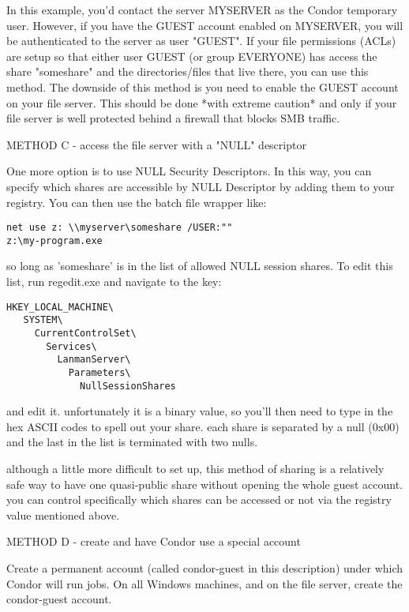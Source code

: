 In this example, you'd contact the server MYSERVER as the Condor temporary 
user.  However, if you have the GUEST account enabled on MYSERVER, you will 
be authenticated to the server as user "GUEST".  If your file permissions 
(ACLs) are setup so that either user GUEST (or group EVERYONE) has access 
the share "someshare" and the directories/files that live there, you can 
use this method.  The downside of this method is you need to enable the 
GUEST account on your file server.   \Warn This should be done *with 
extreme caution* and only if your file server is well protected behind a 
firewall that blocks SMB traffic.

METHOD C - access the file server with a "NULL" descriptor

One more option is to use NULL Security Descriptors.  In this way, you
can specify which shares are accessible by NULL Descriptor by adding
them to your registry.  You can then use the batch file wrapper like:

\begin{verbatim}
net use z: \\myserver\someshare /USER:""
z:\my-program.exe
\end{verbatim}

so long as 'someshare' is in the list of allowed NULL session shares.  To
edit this list, run regedit.exe and navigate to the key:

\begin{verbatim}
HKEY_LOCAL_MACHINE\
   SYSTEM\
     CurrentControlSet\
       Services\
         LanmanServer\
           Parameters\
             NullSessionShares
\end{verbatim}

and edit it.  unfortunately it is a binary value, so you'll then need to
type in the hex ASCII codes to spell out your share.  each share is
separated by a null (0x00) and the last in the list is terminated with
two nulls.

although a little more difficult to set up, this method of sharing is a
relatively safe way to have one quasi-public share without opening the
whole guest account.  you can control specifically which shares can be 
accessed or not via the registry value mentioned above.


METHOD D -  create and have Condor use a special account

Create a permanent account (called condor-guest in this description)
under which Condor will run jobs.
On all Windows machines, and on the file server, create the
condor-guest account.

